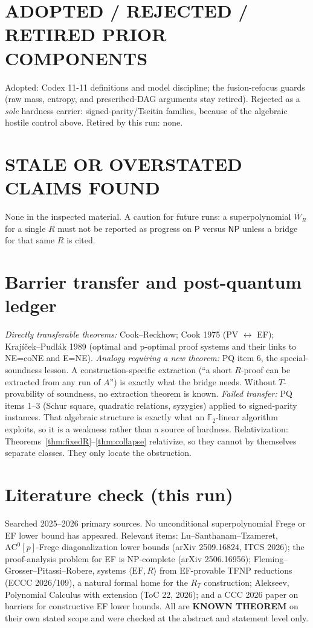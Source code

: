 \documentclass[11pt]{article}
\newcommand{\Pclass}{\mathsf P}
\newcommand{\NP}{\mathsf{NP}}
\newcommand{\Wbar}{\overline W}
\begin{document}
\section*{ADOPTED / REJECTED / RETIRED PRIOR COMPONENTS}
Adopted: Codex 11-11 definitions and model discipline; the fusion-refocus
guards (raw mass, entropy, and prescribed-DAG arguments stay retired).
Rejected as a \emph{sole} hardness carrier: signed-parity/Tseitin families,
because of the algebraic hostile control above.
Retired by this run: none.

\section*{STALE OR OVERSTATED CLAIMS FOUND}
None in the inspected material. A caution for future runs: a superpolynomial
$\Wbar_R$ for a single $R$ must not be reported as progress on $\Pclass$ versus
$\NP$ unless a bridge for that same $R$ is cited.

\section*{Barrier transfer and post-quantum ledger}
\emph{Directly transferable theorems:} Cook--Reckhow; Cook 1975
(PV $\leftrightarrow$ EF); Krajíček--Pudlák 1989 (optimal and p-optimal proof
systems and their links to NE=coNE and E=NE).
\emph{Analogy requiring a new theorem:} PQ item 6, the special-soundness
lesson. A construction-specific extraction (``a short $R$-proof can be
extracted from any run of $A$'') is exactly what the bridge needs. Without
$T$-provability of soundness, no extraction theorem is known.
\emph{Failed transfer:} PQ items 1--3 (Schur square, quadratic relations,
syzygies) applied to signed-parity instances. That algebraic structure is
exactly what an $\mathbb F_2$-linear algorithm exploits, so it is a weakness
rather than a source of hardness.
Relativization: Theorems~\ref{thm:fixedR}--\ref{thm:collapse} relativize, so
they cannot by themselves separate classes. They only locate the obstruction.

\section*{Literature check (this run)}
Searched 2025--2026 primary sources. No unconditional superpolynomial Frege or
EF lower bound has appeared. Relevant items: Lu--Santhanam--Tzameret,
$\mathrm{AC}^0[p]$-Frege diagonalization lower bounds (arXiv 2509.16824,
ITCS 2026); the proof-analysis problem for EF is NP-complete
(arXiv 2506.16956); Fleming--Grosser--Pitassi--Robere, systems
$\langle\mathrm{EF},R\rangle$ from EF-provable TFNP reductions (ECCC 2026/109),
a natural formal home for the $R_T$ construction; Alekseev, Polynomial Calculus
with extension (ToC 22, 2026); and a CCC 2026 paper on barriers for
constructive EF lower bounds. All are \textbf{KNOWN THEOREM} on their own
stated scope and were checked at the abstract and statement level only.
\end{document}
